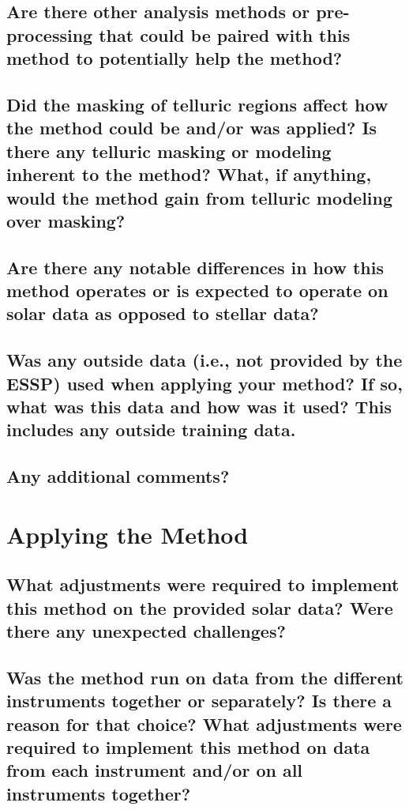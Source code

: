 \documentclass[12pt]{article}
\numberwithin{equation}{section}
\begin{document}
\subsection{Are there other analysis methods or pre-processing that could be paired with this method to potentially help the method?}

\subsection{Did the masking of telluric regions affect how the method could be and/or was applied?  Is there any telluric masking or modeling inherent to the method?  What, if anything, would the method gain from telluric modeling over masking?}

\subsection{Are there any notable differences in how this method operates or is expected to operate on solar data as opposed to stellar data?}

\subsection{Was any outside data (i.e., not provided by the ESSP) used when applying your method?  If so, what was this data and how was it used? This includes any outside training data.}

\subsection{Any additional comments?}


\section{Applying the Method}
\subsection{What adjustments were required to implement this method on the provided solar data?  Were there any unexpected challenges?}

\subsection{Was the method run on data from the different instruments together or separately?  Is there a reason for that choice?  What adjustments were required to implement this method on data from each instrument and/or on all instruments together?}
\end{document}
